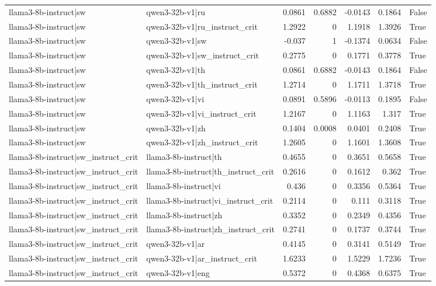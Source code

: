 \begin{table}
\begin{tabular}{l l r r r r l}
llama3-8b-instruct|sw & qwen3-32b-v1|ru & 0.0861 & 0.6882 & -0.0143 & 0.1864 & False \\
llama3-8b-instruct|sw & qwen3-32b-v1|ru_instruct_crit & 1.2922 & 0 & 1.1918 & 1.3926 & True \\
llama3-8b-instruct|sw & qwen3-32b-v1|sw & -0.037 & 1 & -0.1374 & 0.0634 & False \\
llama3-8b-instruct|sw & qwen3-32b-v1|sw_instruct_crit & 0.2775 & 0 & 0.1771 & 0.3778 & True \\
llama3-8b-instruct|sw & qwen3-32b-v1|th & 0.0861 & 0.6882 & -0.0143 & 0.1864 & False \\
llama3-8b-instruct|sw & qwen3-32b-v1|th_instruct_crit & 1.2714 & 0 & 1.1711 & 1.3718 & True \\
llama3-8b-instruct|sw & qwen3-32b-v1|vi & 0.0891 & 0.5896 & -0.0113 & 0.1895 & False \\
llama3-8b-instruct|sw & qwen3-32b-v1|vi_instruct_crit & 1.2167 & 0 & 1.1163 & 1.317 & True \\
llama3-8b-instruct|sw & qwen3-32b-v1|zh & 0.1404 & 0.0008 & 0.0401 & 0.2408 & True \\
llama3-8b-instruct|sw & qwen3-32b-v1|zh_instruct_crit & 1.2605 & 0 & 1.1601 & 1.3608 & True \\
llama3-8b-instruct|sw_instruct_crit & llama3-8b-instruct|th & 0.4655 & 0 & 0.3651 & 0.5658 & True \\
llama3-8b-instruct|sw_instruct_crit & llama3-8b-instruct|th_instruct_crit & 0.2616 & 0 & 0.1612 & 0.362 & True \\
llama3-8b-instruct|sw_instruct_crit & llama3-8b-instruct|vi & 0.436 & 0 & 0.3356 & 0.5364 & True \\
llama3-8b-instruct|sw_instruct_crit & llama3-8b-instruct|vi_instruct_crit & 0.2114 & 0 & 0.111 & 0.3118 & True \\
llama3-8b-instruct|sw_instruct_crit & llama3-8b-instruct|zh & 0.3352 & 0 & 0.2349 & 0.4356 & True \\
llama3-8b-instruct|sw_instruct_crit & llama3-8b-instruct|zh_instruct_crit & 0.2741 & 0 & 0.1737 & 0.3744 & True \\
llama3-8b-instruct|sw_instruct_crit & qwen3-32b-v1|ar & 0.4145 & 0 & 0.3141 & 0.5149 & True \\
llama3-8b-instruct|sw_instruct_crit & qwen3-32b-v1|ar_instruct_crit & 1.6233 & 0 & 1.5229 & 1.7236 & True \\
llama3-8b-instruct|sw_instruct_crit & qwen3-32b-v1|eng & 0.5372 & 0 & 0.4368 & 0.6375 & True \\

\end{tabular}
\end{table}
